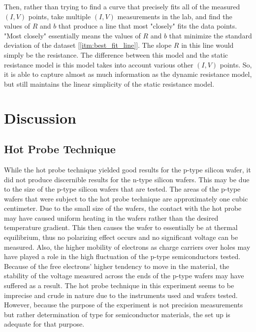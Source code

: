 \documentclass{article}
\begin{document}
Then, rather than trying to find a curve that precisely fits all of the measured $(I,V)$ points, take multiple $(I,V)$ measurements in the lab, and find the values of $R$ and $b$ that produce a line that most "closely" fits the data points. "Most closely" essentially means the values of $R$ and $b$ that minimize the standard deviation of the dataset [\ref{itm:best_fit_line}].
The slope $R$ in this line would simply be the resistance. The difference between this model and the static resistance model is this model takes into account various other $(I,V)$ points. So, it is able to capture almost as much information as the dynamic resistance model, but still maintains the linear simplicity of the static resistance model.

	
	\section{Discussion}
	\subsection{Hot Probe Technique}
	While the hot probe technique yielded good results for the p-type silicon wafer, it did not produce discernible results for the n-type silicon wafers. This may be due to the size of the p-type silicon wafers that are tested. The areas of the p-type wafers that were subject to the hot probe technique are approximately one cubic centimeter. Due to the small size of the wafers, the contact with the hot probe may have caused uniform heating in the wafers rather than the desired temperature gradient. This then causes the wafer to essentially be at thermal equilibrium, thus no polarizing effect occurs and no significant voltage can be measured. Also, the higher mobility of electrons as charge carriers over holes may have played a role in the high fluctuation of the p-type semiconductors tested. Because of the free electrons' higher tendency to move in the material, the stability of the voltage measured across the ends of the p-type wafers may have suffered as a result. The hot probe technique in this experiment seems to be imprecise and crude in nature due to the instruments used and wafers tested. However, because the purpose of the experiment is not precision measurements but rather determination of type for semiconductor materials, the set up is adequate for that purpose.
\end{document}
